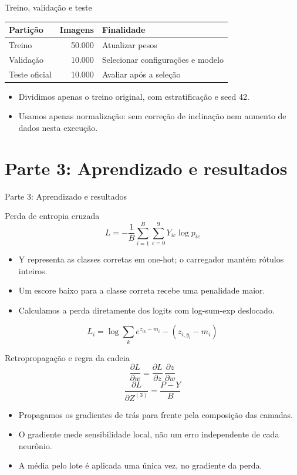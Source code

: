 \documentclass[aspectratio=169,10pt]{beamer}
\begin{document}
\begin{frame}{Treino, validação e teste}
\begin{center}\begin{tabular}{lrl}\toprule Partição & Imagens & Finalidade\\\midrule Treino & 50.000 & Atualizar pesos\\ Validação & 10.000 & Selecionar configurações e modelo\\ Teste oficial & 10.000 & Avaliar após a seleção\\\bottomrule\end{tabular}\end{center}\begin{itemize}
\item Dividimos apenas o treino original, com estratificação e seed 42.
\item Usamos apenas normalização: sem correção de inclinação nem aumento de dados nesta execução.
\end{itemize}
\end{frame}

\section{Parte 3: Aprendizado e resultados}
\begin{frame}{Parte 3: Aprendizado e resultados}
\tableofcontents[currentsection]\end{frame}

\begin{frame}{Perda de entropia cruzada}
\[L=-\frac1B\sum_{i=1}^{B}\sum_{c=0}^{9}Y_{ic}\log p_{ic}\]\begin{itemize}
\item Y representa as classes corretas em one-hot; o carregador mantém rótulos inteiros.
\item Um escore baixo para a classe correta recebe uma penalidade maior.
\item Calculamos a perda diretamente dos logits com log-sum-exp deslocado.
\end{itemize}
\[L_i=\log\sum_k e^{z_{ik}-m_i}-(z_{i,y_i}-m_i)\]\end{frame}

\begin{frame}{Retropropagação e regra da cadeia}
\[\frac{\partial L}{\partial w}=\frac{\partial L}{\partial z}\,\frac{\partial z}{\partial w}\]\[\frac{\partial L}{\partial Z^{(3)}}=\frac{P-Y}{B}\]\begin{itemize}
\item Propagamos os gradientes de trás para frente pela composição das camadas.
\item O gradiente mede sensibilidade local, não um erro independente de cada neurônio.
\item A média pelo lote é aplicada uma única vez, no gradiente da perda.
\end{itemize}
\end{frame}
\end{document}
